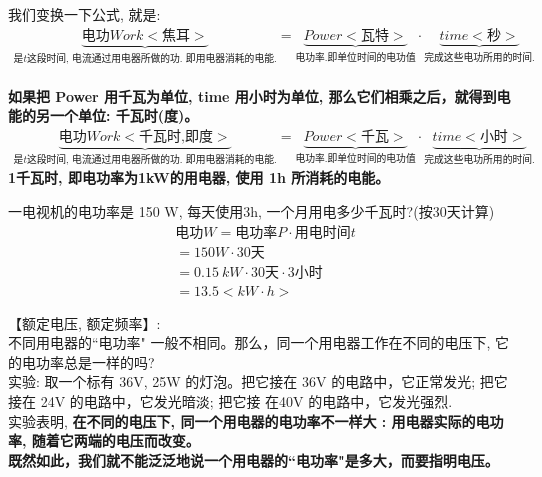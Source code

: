 \documentclass[UTF8]{ctexart}
\begin{document}
我们变换一下公式, 就是: 
\begin{align*}
			\underset{\text{是}t\text{这段时间,\ 电流通过用电器所做的功.\ 即用电器消耗的电能}.}{\underbrace{\text{电功}Work<\text{焦耳}>}}=\underset{\text{电功率.即单位时间的电功值}}{\underbrace{Power<\text{瓦特}>}}\cdot \underset{\text{完成这些电功所用的时间}.}{\underbrace{time<\text{秒}>}}
\end{align*} \\

\textbf{如果把 Power 用千瓦为单位, time 用小时为单位, 那么它们相乘之后，就得到电能的另一个单位: 千瓦时(度)。 }
\begin{align*}
		\underset{\text{是}t\text{这段时间,\ 电流通过用电器所做的功.\ 即用电器消耗的电能}.}{\underbrace{\text{电功}Work<\text{千瓦时,即度}>}}=\underset{\text{电功率.即单位时间的电功值}}{\underbrace{Power<\text{千瓦}>}}\cdot \underset{\text{完成这些电功所用的时间}.}{\underbrace{time<\text{小时}>}}	
\end{align*}
\textbf{1千瓦时, 即电功率为1kW的用电器, 使用 1h 所消耗的电能。} \\



\begin{tcolorbox}[title = {例},boxrule={0.1em},colframe={black!10}, colback={black!3},colbacktitle={black!10},coltitle={black}]
一电视机的电功率是 150 W, 每天使用3h, 一个月用电多少千瓦时?(按30天计算) 
\begin{align*}
	& \text{电功}W=\text{电功率}P\cdot \text{用电时间}t \\
	& =150W\cdot 30\text{天} \\
	& =0.15\ kW\cdot 30\text{天}\cdot 3\text{小时}\\
	& =13.5<kW\cdot h>
\end{align*}
\end{tcolorbox}




【额定电压, 额定频率】:\\
不同用电器的``电功率" 一般不相同。那么，同一个用电器工作在不同的电压下, 它的电功率总是一样的吗? \\

实验: 取一个标有 36V, 25W 的灯泡。把它接在 36V 的电路中，它正常发光; 把它接在 24V 的电路中，它发光暗淡; 把它接 在40V 的电路中，它发光强烈. \\

实验表明, \textbf{在不同的电压下, 同一个用电器的电功率不一样大 : 用电器实际的电功率, 随着它两端的电压而改变。} \\
\textbf{既然如此，我们就不能泛泛地说一个用电器的``电功率"是多大，而要指明电压。}\\
\end{document}
